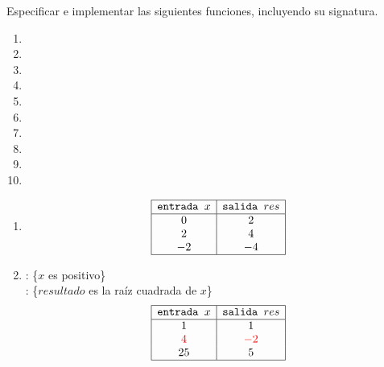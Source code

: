\documentclass[12pt,a4paper,spanish]{article}
\begin{document}
\ejercicio \FiveStar
Especificar e implementar las siguientes funciones, incluyendo su signatura.
\begin{enumerate}[label=\alph*)]
  \item

  \item
  \item
  \item
  \item
  \item
  \item
  \item
  \item
  \item
\end{enumerate}

\begin{enumerate}[label=\alph*)]
	\item
	      \[
		      \begin{array}{|c|c|}
			      \hline
			      \texttt{entrada }x & \texttt{salida }res \\  \hline
			      0                  & 2                   \\
			      2                  & 4                   \\
			      -2                 & -4                  \\\hline
		      \end{array}
	      \]

	\item
	      \requiere: \{$x$ es positivo\}\\
	      \asegura: \{$resultado$ es la raíz cuadrada de $x$\}
	      \[
		      \begin{array}{|c|c|}
			      \hline
			      \texttt{entrada }x & \texttt{salida }res \\  \hline
			      1                  & 1                   \\
			      {\color{red}\text{$4$}}          & {\color{red}\text{$-2$}}          \\
			      25                 & 5                   \\\hline
		      \end{array}
	      \]
	      \\
	      \\



\end{enumerate}
\end{document}
